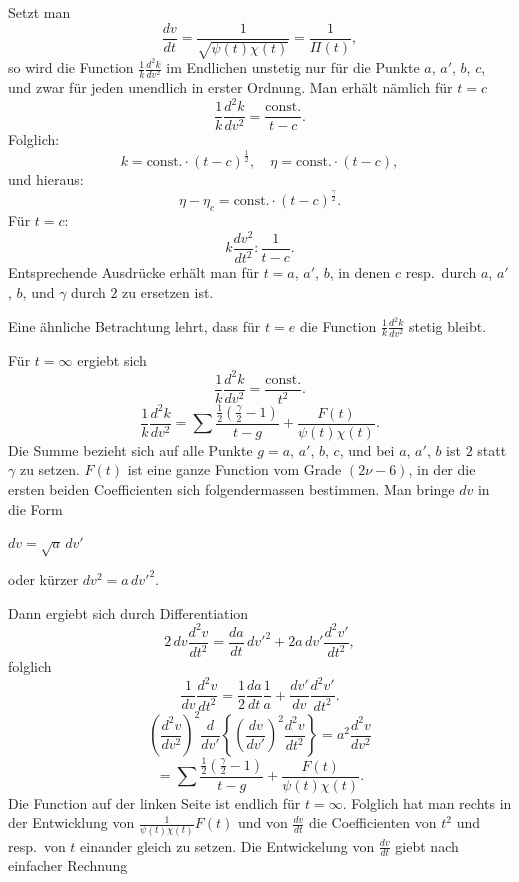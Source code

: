\documentclass[12pt,a4paper]{article}
\begin{document}
Setzt man
\begin{equation}\tag{17}
\frac{dv}{dt} = \frac{1}{\sqrt{\psi(t)\chi(t)}} = \frac{1}{\Pi(t)},
\end{equation}
so wird die Function $\frac{1}{k} \frac{d^{2}k}{dv^{2}}$ im Endlichen unstetig nur f\"ur die Punkte $a$, $a'$, $b$, $c$, und zwar f\"ur jeden unendlich in erster Ordnung. Man erh\"alt n\"amlich f\"ur $t = c$
\[\frac{1}{k} \frac{d^{2}k}{dv^{2}} = \frac{\text{const.}}{t-c}.\]
Folglich:
\[k = \text{const.} \cdot (t-c)^{\frac{1}{2}}, \quad \eta = \text{const.} \cdot (t-c),\]
und hieraus:
\[\eta - \eta_{c} = \text{const.} \cdot (t-c)^{\frac{\gamma}{2}}.\]
F\"ur $t = c$:
\[k \frac{dv^{2}}{dt^{2}} : \frac{1}{t-c}.\]
Entsprechende Ausdr\"ucke erh\"alt man f\"ur $t = a$, $a'$, $b$, in denen $c$ resp.\ durch $a$, $a'$, $b$, und $\gamma$ durch $2$ zu ersetzen ist.

Eine \"ahnliche Betrachtung lehrt, dass f\"ur $t = e$ die Function $\frac{1}{k} \frac{d^{2}k}{dv^{2}}$ stetig bleibt.

F\"ur $t = \infty$ ergiebt sich
\[\frac{1}{k} \frac{d^{2}k}{dv^{2}} = \frac{\text{const.}}{t^{2}}.\]
\[\frac{1}{k} \frac{d^{2}k}{dv^{2}} = \sum \frac{\frac{1}{2}(\frac{\gamma}{2}-1)}{t-g} + \frac{F(t)}{\psi(t)\chi(t)}.\]
Die Summe bezieht sich auf alle Punkte $g = a$, $a'$, $b$, $c$, und bei $a$, $a'$, $b$ ist $2$ statt $\gamma$ zu setzen. $F(t)$ ist eine ganze Function vom Grade $(2\nu - 6)$, in der die ersten beiden Coefficienten sich folgendermassen bestimmen. Man bringe $dv$ in die Form

\newpage
\noindent $dv = \sqrt{a}\, dv'$

oder k\"urzer $dv^{2} = a\, dv'^{2}$.

Dann ergiebt sich durch Differentiation
\[2\, dv \frac{d^{2}v}{dt^{2}} = \frac{da}{dt}\, dv'^{2} + 2a\, dv' \frac{d^{2}v'}{dt^{2}},\]
folglich
\[\frac{1}{dv} \frac{d^{2}v}{dt^{2}} = \frac{1}{2} \frac{da}{dt}\frac{1}{a} + \frac{dv'}{dv} \frac{d^{2}v'}{dt^{2}}.\]
\[\left(\frac{d^{2}v}{dv^{2}}\right)^{2} \frac{d}{dv'} \left\{\left(\frac{dv}{dv'}\right)^{2} \frac{d^{2}v}{dt^{2}}\right\} = a^{2} \frac{d^{2}v}{dv^{2}}\]
\[= \sum \frac{\frac{1}{2}(\frac{\gamma}{2}-1)}{t-g} + \frac{F(t)}{\psi(t)\chi(t)}.\]
Die Function auf der linken Seite ist endlich f\"ur $t = \infty$. Folglich hat man rechts in der Entwicklung von $\frac{1}{\psi(t)\chi(t)} F(t)$ und von $\frac{dv}{dt}$ die Coefficienten von $t^{2}$ und resp.\ von $t$ einander gleich zu setzen. Die Entwickelung von $\frac{dv}{dt}$ giebt nach einfacher Rechnung
\end{document}

